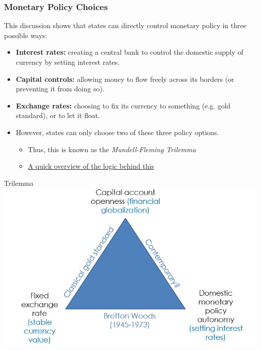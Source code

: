\documentclass[handout]{beamer}
\begin{document}
\begin{frame} 
	\frametitle{\LARGE{Monetary Policy Choices}}
	This discussion shows that states can directly control monetary policy in three possible ways:
	\begin{itemize}
		\item \textbf{Interest rates:} creating a central bank to control the domestic supply of currency by setting interest rates. \pause 
		\item \textbf{Capital controls:} allowing money to flow freely across its borders (or preventing it from doing so). \pause 
		\item \textbf{Exchange rates:} choosing to fix its currency to something (e.g. gold standard), or to let it float. \pause 
		\item However, states can only choose two of these three policy options. \pause 
		\begin{itemize}
			\item Thus, this is known as the \textit{Mundell-Fleming Trilemma} \pause
			\item \href{https://www.youtube.com/watch?v=yt0m7N3bqXM}{A quick overview of the logic behind this} 
		\end{itemize}
	\end{itemize}
\end{frame}

\begin{frame}{\LARGE Trilemma}
	\centering
	\includegraphics[width=\textwidth,height=0.8\textheight,keepaspectratio]{trilemma.JPG}
\end{frame}
\end{document}
